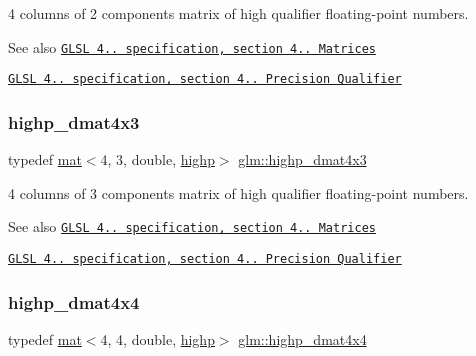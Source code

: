 4 columns of 2 components matrix of high qualifier floating-\/point numbers.

\begin{DoxySeeAlso}{See also}
\href{http://www.opengl.org/registry/doc/GLSLangSpec.4.20.8.pdf}{\tt G\+L\+SL 4.. specification, section 4.. Matrices} 

\href{http://www.opengl.org/registry/doc/GLSLangSpec.4.20.8.pdf}{\tt G\+L\+SL 4.. specification, section 4.. Precision Qualifier} 
\end{DoxySeeAlso}
\mbox{\label{group__core__precision_ga9a5dab260df6e8c46c747bac0b8d2f38}} 
\subsubsection{\texorpdfstring{highp\+\_\+dmat4x3}{highp\_dmat4x3}}
{\footnotesize\ttfamily typedef \mbox{\hyperlink{structglm_1_1mat}{mat}}$<$4, 3, double, \mbox{\hyperlink{namespaceglm_a36ed105b07c7746804d7fdc7cc90ff25ac6f7eab42eacbb10d59a58e95e362074}{highp}}$>$ \mbox{\hyperlink{group__core__precision_ga9a5dab260df6e8c46c747bac0b8d2f38}{glm\+::highp\+\_\+dmat4x3}}}

4 columns of 3 components matrix of high qualifier floating-\/point numbers.

\begin{DoxySeeAlso}{See also}
\href{http://www.opengl.org/registry/doc/GLSLangSpec.4.20.8.pdf}{\tt G\+L\+SL 4.. specification, section 4.. Matrices} 

\href{http://www.opengl.org/registry/doc/GLSLangSpec.4.20.8.pdf}{\tt G\+L\+SL 4.. specification, section 4.. Precision Qualifier} 
\end{DoxySeeAlso}
\mbox{\label{group__core__precision_gad3df38df8c4f7ef9b38f03581ff60142}} 
\subsubsection{\texorpdfstring{highp\+\_\+dmat4x4}{highp\_dmat4x4}}
{\footnotesize\ttfamily typedef \mbox{\hyperlink{structglm_1_1mat}{mat}}$<$4, 4, double, \mbox{\hyperlink{namespaceglm_a36ed105b07c7746804d7fdc7cc90ff25ac6f7eab42eacbb10d59a58e95e362074}{highp}}$>$ \mbox{\hyperlink{group__core__precision_gad3df38df8c4f7ef9b38f03581ff60142}{glm\+::highp\+\_\+dmat4x4}}}

